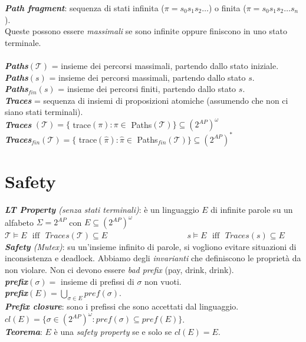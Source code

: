 \documentclass[a4paper, notitlepage, 9pt]{extreport}
\begin{document}
\noindent
\textit{\textbf{Path fragment}}: sequenza di stati infinita ($\pi = s_0 s_1 s_2\dots$) o finita ($\pi = s_0 s_1 s_2\dots s_n$).\\
Queste possono essere \textit{massimali} se sono infinite oppure finiscono in uno stato terminale.\\\\
\textit{\textbf{Paths}}$(\mathcal{T})$ = insieme dei percorsi massimali, partendo dallo stato iniziale.\\
\textit{\textbf{Paths}}$(s)$ = insieme dei percorsi massimali, partendo dallo stato $s$.\\
\textit{\textbf{Paths}}$_{fin}(s)$ = insieme dei percorsi finiti, partendo dallo stato $s$.\\
\textit{\textbf{Traces}} = sequenza di insiemi di proposizioni atomiche (assumendo che non ci siano stati terminali).\\
\textit{\textbf{Traces}} $(\mathcal{T}) = \{$ trace$(\pi): \pi \in$ Paths$(\mathcal{T})\} \subseteq (2^{AP})^\omega$\\
\textit{\textbf{Traces}}$_{fin} (\mathcal{T}) = \{$ trace$(\hat{\pi}): \hat{\pi} \in$ Paths$_{fin}(\mathcal{T})\} \subseteq (2^{AP})^*$


\section*{Safety}
\textit{\textbf{LT Property} (senza stati terminali)}: è un linguaggio $E$ di infinite parole su un alfabeto $\Sigma = 2^{AP}$ con $E \subseteq (2^{AP})^\omega$\\
$\mathcal{T} \vDash E \text{ ~iff~ } Traces(\mathcal{T}) \subseteq E$ ~~~~~~~~~~~~~~~~~~ $s \vDash E \text{ ~iff~ } Traces(s) \subseteq E$\\
\textit{\textbf{Safety} (Mutex)}: su un'insieme infinito di parole, si vogliono evitare situazioni di inconsistenza e deadlock. Abbiamo degli \textit{invarianti} che definiscono le proprietà da non violare. Non ci devono essere \textit{bad prefix} (pay, drink, drink).\\
\textit{\textbf{prefix}}$(\sigma) = $ insieme di prefissi di $\sigma$ non vuoti.\\
\textit{\textbf{prefix}}$(E) = \bigcup_{\sigma \in E} pref(\sigma)$.\\
\textit{\textbf{Prefix closure}}: sono i prefissi che sono accettati dal linguaggio. ~~~$cl(E) = \{ \sigma \in (2^{AP})^\omega : pref(\sigma) \subseteq pref(E) \}$.\\
\textit{\textbf{Teorema}}: $E$ è una \textit{safety property} se e solo se $cl(E) = E$.
\end{document}
